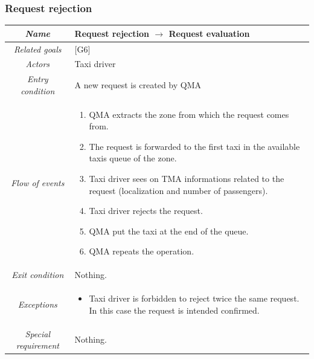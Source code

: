 \clearpage{}


\subsubsection{Request rejection}

\begin{flushleft}
\begin{tabular}{c|>{\centering}p{10cm}}
\hline 
\emph{Name} & \raggedright{}Request rejection $\rightarrow$ Request evaluation\tabularnewline
\hline 
\emph{Related goals} & \raggedright{}{[}G6{]}\tabularnewline
\hline 
\emph{Actors} & \raggedright{}Taxi driver\tabularnewline
\hline 
\emph{Entry condition} & \raggedright{}A new request is created by QMA\tabularnewline
\hline 
\emph{Flow of events} & \begin{enumerate}
\item \begin{raggedright}
QMA extracts the zone from which the request comes from.
\par\end{raggedright}
\item \begin{raggedright}
The request is forwarded to the first taxi in the available taxis
queue of the zone.
\par\end{raggedright}
\item \begin{raggedright}
Taxi driver sees on TMA informations related to the request (localization
and number of passengers).
\par\end{raggedright}
\item \begin{raggedright}
Taxi driver rejects the request.
\par\end{raggedright}
\item \begin{raggedright}
QMA put the taxi at the end of the queue.
\par\end{raggedright}
\item \raggedright{}QMA repeats the operation.\end{enumerate}
\tabularnewline
\hline 
\emph{Exit condition} & \raggedright{}Nothing.\tabularnewline
\hline 
\emph{Exceptions} & \begin{itemize}
\item \raggedright{}Taxi driver is forbidden to reject twice the same request.
In this case the request is intended confirmed.\end{itemize}
\tabularnewline
\hline 
\emph{Special requirement} & \raggedright{}Nothing.\tabularnewline
\hline 
\end{tabular}
\par\end{flushleft}

